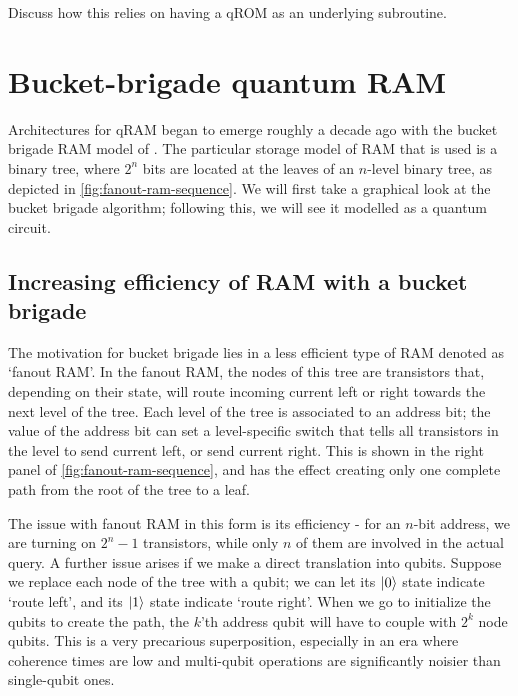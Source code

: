 \documentclass[a4paper,12pt]{article}
\begin{document}
Discuss how this relies on having a qROM as an underlying subroutine.




\section{Bucket-brigade quantum RAM}
\label{sec:bb}

Architectures for qRAM began to emerge roughly a decade ago with the bucket brigade RAM model of \cite{Giovannetti2008, Giovannetti2008b}. 
The particular storage model of RAM that is used is a binary tree, where $2^n$ bits are located at the leaves of an $n$-level binary tree, as depicted in \autoref{fig:fanout-ram-sequence}. 
We will first take a graphical look at the bucket brigade algorithm; following this, we will see it modelled as a quantum circuit.

\subsection{Increasing efficiency of RAM with a bucket brigade}

The motivation for bucket brigade lies in a less efficient type of RAM denoted as `fanout RAM'. 
In the fanout RAM, the nodes of this tree are transistors that, depending on their state, will route incoming current left or right towards the next level of the tree. 
Each level of the tree is associated to an address bit; the value of the address bit can set a level-specific switch that tells all transistors in the level to send current left, or send current right. 
This is shown in the right panel of \autoref{fig:fanout-ram-sequence}, and has the effect creating only one complete path from the root of the tree to a leaf.


The issue with fanout RAM in this form is its efficiency - for an $n$-bit address, we are turning on $2^n - 1$ transistors, while only $n$ of them are involved in the actual query. 
A further issue arises if we make a direct translation into qubits. 
Suppose we replace each node of the tree with a qubit; we can let its $\ket{0}$ state indicate `route left', and its $\ket{1}$ state indicate `route right'. 
When we go to initialize the qubits to create the path, the $k$'th address qubit will have to couple with $2^k$ node qubits. 
This is a very precarious superposition, especially in an era where coherence times are low and multi-qubit operations are significantly noisier than single-qubit ones.
\end{document}
